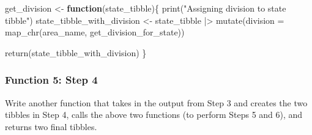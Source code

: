 \documentclass[
  letterpaper,
  DIV=11,
  numbers=noendperiod]{scrartcl}
\newenvironment{Shaded}{\begin{snugshade}}{\end{snugshade}}
\newcommand{\AttributeTok}[1]{\textcolor[rgb]{0.40,0.45,0.13}{#1}}
\newcommand{\ControlFlowTok}[1]{\textcolor[rgb]{0.00,0.23,0.31}{\textbf{#1}}}
\newcommand{\FunctionTok}[1]{\textcolor[rgb]{0.28,0.35,0.67}{#1}}
\newcommand{\NormalTok}[1]{\textcolor[rgb]{0.00,0.23,0.31}{#1}}
\newcommand{\OtherTok}[1]{\textcolor[rgb]{0.00,0.23,0.31}{#1}}
\newcommand{\SpecialCharTok}[1]{\textcolor[rgb]{0.37,0.37,0.37}{#1}}
\newcommand{\StringTok}[1]{\textcolor[rgb]{0.13,0.47,0.30}{#1}}
\begin{document}
\begin{Shaded}
\begin{Highlighting}[]
\NormalTok{get\_division }\OtherTok{\textless{}{-}} \ControlFlowTok{function}\NormalTok{(state\_tibble)\{}
  \FunctionTok{print}\NormalTok{(}\StringTok{"Assigning division to state tibble"}\NormalTok{)}
\NormalTok{  state\_tibble\_with\_division }\OtherTok{\textless{}{-}}\NormalTok{ state\_tibble }\SpecialCharTok{|\textgreater{}} 
    \FunctionTok{mutate}\NormalTok{(}\AttributeTok{division =} \FunctionTok{map\_chr}\NormalTok{(area\_name, get\_division\_for\_state))}
  
  \FunctionTok{return}\NormalTok{(state\_tibble\_with\_division)}
\NormalTok{\}}
\end{Highlighting}
\end{Shaded}

\subsubsection{Function 5: Step 4}\label{function-5-step-4}

Write another function that takes in the output from Step 3 and creates
the two tibbles in Step 4, calls the above two functions (to perform
Steps 5 and 6), and returns two final tibbles.
\end{document}

